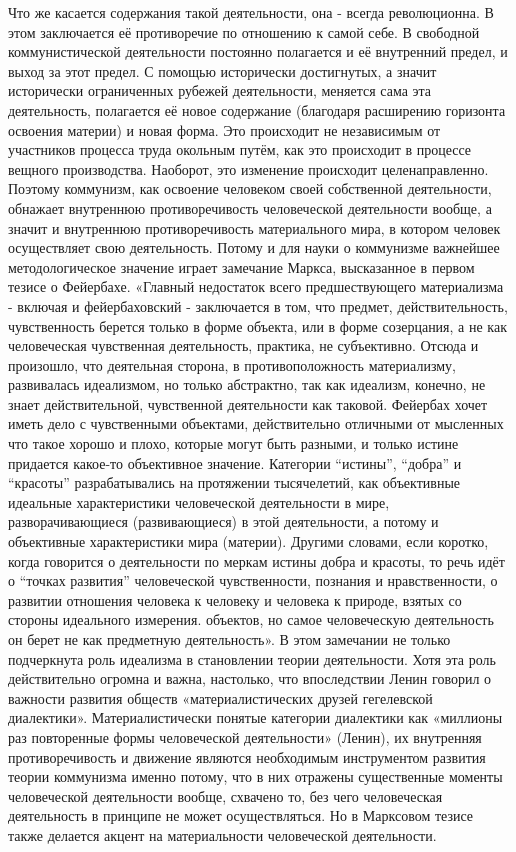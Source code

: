 \documentclass[12pt,a4paper,openany]{book}
\begin{document}
Что же касается содержания такой деятельности, она - всегда революционна. В этом заключается её противоречие по отношению к самой себе. В свободной коммунистической деятельности постоянно полагается и её внутренний предел, и выход за этот предел. С помощью исторически достигнутых, а значит исторически ограниченных рубежей деятельности, меняется сама эта деятельность, полагается её новое содержание (благодаря расширению горизонта освоения материи) и новая форма. Это происходит не независимым от участников процесса труда окольным путём, как это происходит в процессе вещного производства. Наоборот, это изменение происходит целенаправленно. Поэтому коммунизм, как освоение человеком своей собственной деятельности, обнажает внутреннюю противоречивость человеческой деятельности вообще, а значит и внутреннюю противоречивость материального мира, в котором человек осуществляет свою деятельность. Потому и для науки о коммунизме важнейшее методологическое значение играет замечание Маркса, высказанное в первом тезисе о Фейербахе. «Главный недостаток всего предшествующего материализма - включая и фейербаховский - заключается в том, что предмет, действительность, чувственность берется только в форме объекта, или в форме созерцания, а не как человеческая чувственная деятельность, практика, не субъективно. Отсюда и произошло, что деятельная сторона, в противоположность материализму, развивалась идеализмом, но только абстрактно, так как идеализм, конечно, не знает действительной, чувственной деятельности как таковой. Фейербах хочет иметь дело с чувственными объектами, действительно отличными от мысленных что такое хорошо и плохо, которые могут быть разными, и только истине придается какое-то объективное значение. Категории “истины”, “добра” и “красоты” разрабатывались на протяжении тысячелетий, как объективные идеальные характеристики человеческой деятельности в мире, разворачивающиеся (развивающиеся) в этой деятельности, а потому и объективные характеристики мира (материи). Другими словами, если коротко, когда говорится о деятельности по меркам истины добра и красоты, то речь идёт о “точках развития” человеческой чувственности, познания и нравственности, о развитии отношения человека к человеку и человека к природе, взятых со стороны идеального измерения. объектов, но самое человеческую деятельность он берет не как предметную деятельность». В этом замечании не только подчеркнута роль идеализма в становлении теории деятельности. Хотя эта роль действительно огромна и важна, настолько, что впоследствии Ленин говорил о важности развития обществ «материалистических друзей гегелевской диалектики». Материалистически понятые категории диалектики как «миллионы раз повторенные формы человеческой деятельности» (Ленин), их внутренняя противоречивость и движение являются необходимым инструментом развития теории коммунизма именно потому, что в них отражены существенные моменты человеческой деятельности вообще, схвачено то, без чего человеческая деятельность в принципе не может осуществляться. Но в Марксовом тезисе также делается акцент на материальности человеческой деятельности.
\end{document}
